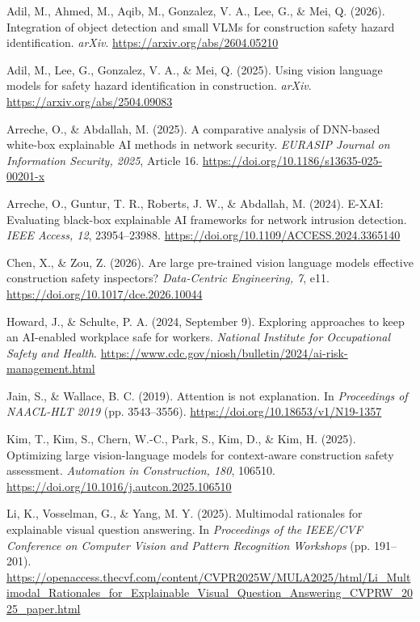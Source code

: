\documentclass[12pt,letterpaper,twoside]{article}
\newenvironment{apareferences}
  {\begin{list}{}{%
    \setlength{\leftmargin}{0.5in}%
    \setlength{\itemindent}{-0.5in}%
    \setlength{\itemsep}{0pt}%
    \setlength{\parsep}{0pt}%
    \setlength{\topsep}{0pt}}}
  {\end{list}}
\begin{document}
\begin{apareferences}
\item Adil, M., Ahmed, M., Aqib, M., Gonzalez, V. A., Lee, G., \& Mei, Q. (2026). Integration of object detection and small VLMs for construction safety hazard identification. \textit{arXiv}. \url{https://arxiv.org/abs/2604.05210}

\item Adil, M., Lee, G., Gonzalez, V. A., \& Mei, Q. (2025). Using vision language models for safety hazard identification in construction. \textit{arXiv}. \url{https://arxiv.org/abs/2504.09083}

\item Arreche, O., \& Abdallah, M. (2025). A comparative analysis of DNN-based white-box explainable AI methods in network security. \textit{EURASIP Journal on Information Security, 2025}, Article 16. \url{https://doi.org/10.1186/s13635-025-00201-x}

\item Arreche, O., Guntur, T. R., Roberts, J. W., \& Abdallah, M. (2024). E-XAI: Evaluating black-box explainable AI frameworks for network intrusion detection. \textit{IEEE Access, 12}, 23954--23988. \url{https://doi.org/10.1109/ACCESS.2024.3365140}

\item Chen, X., \& Zou, Z. (2026). Are large pre-trained vision language models effective construction safety inspectors? \textit{Data-Centric Engineering, 7}, e11. \url{https://doi.org/10.1017/dce.2026.10044}

\item Howard, J., \& Schulte, P. A. (2024, September 9). Exploring approaches to keep an AI-enabled workplace safe for workers. \textit{National Institute for Occupational Safety and Health}. \url{https://www.cdc.gov/niosh/bulletin/2024/ai-risk-management.html}

\item Jain, S., \& Wallace, B. C. (2019). Attention is not explanation. In \textit{Proceedings of NAACL-HLT 2019} (pp. 3543--3556). \url{https://doi.org/10.18653/v1/N19-1357}

\item Kim, T., Kim, S., Chern, W.-C., Park, S., Kim, D., \& Kim, H. (2025). Optimizing large vision-language models for context-aware construction safety assessment. \textit{Automation in Construction, 180}, 106510. \url{https://doi.org/10.1016/j.autcon.2025.106510}

\item Li, K., Vosselman, G., \& Yang, M. Y. (2025). Multimodal rationales for explainable visual question answering. In \textit{Proceedings of the IEEE/CVF Conference on Computer Vision and Pattern Recognition Workshops} (pp. 191--201). \url{https://openaccess.thecvf.com/content/CVPR2025W/MULA2025/html/Li_Multimodal_Rationales_for_Explainable_Visual_Question_Answering_CVPRW_2025_paper.html}


\end{apareferences}
\end{document}

